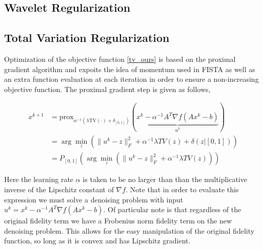 \documentclass[10pt,a4paper]{article}
\newcommand{\prox}{\mathrm{prox}}
\begin{document}
\subsection{Wavelet Regularization}

\subsection{Total Variation Regularization}

Optimization of the objective function \eqref{tv_ours} is based on the proximal gradient algorithm and expoits the idea of momentum used in FISTA as well as an extra function evaluation at each iteration in order to ensure a non-increasing objective function.  The proximal gradient step is given as follows,

\begin{align*}
x^{k+1} &= \prox_{\alpha^{-1}(\lambda \textrm{TV}(\cdot) + \delta_{[0,1]})} (\underbrace{x^k - \alpha^{-1} A^T\nabla f (Ax^k - b)}_{u^k}) \\
&= \arg \min_z \left( \|u^k - z\|_F^2 + \alpha^{-1}\lambda TV(z) + \delta(z | [0,1]) \right) \\
&= P_{[0,1]}  \left( \arg \min_z \left( \|u^k - z\|_F^2 + \alpha^{-1}\lambda TV(z) \right) \right)
\end{align*}

Here the learning rate $\alpha$ is taken to be no larger than than the multiplicative inverse of the Lipschitz constant of $\nabla f$.  Note that in order to evaluate this expression we must solve a denoising problem with input $u^k = x^k - \alpha^{-1} A^T\nabla f (Ax^k - b)$.  Of particular note is that regardless of the original fidelity term we have a Frobenius norm fidelity term on the new denoising problem.  This allows for the easy manipulation of the original fidelity function, so long as it is convex and has Lipschitz gradient.
\end{document}
